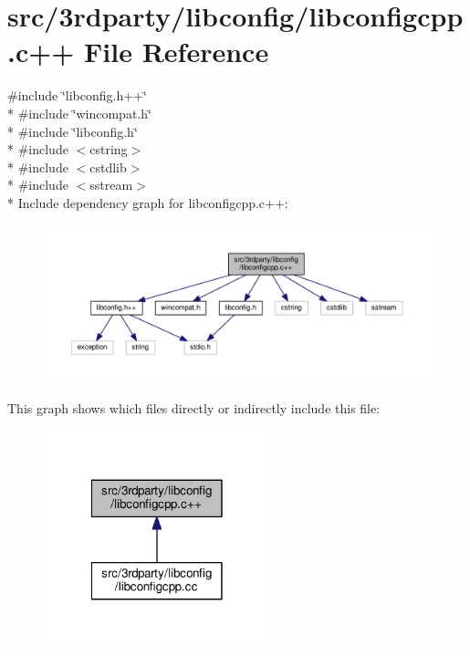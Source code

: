 \hypertarget{libconfigcpp_8c_09_09}{\section{src/3rdparty/libconfig/libconfigcpp.c++ File Reference}
\label{libconfigcpp_8c_09_09}
}
{\ttfamily \#include \char`\"{}libconfig.\-h++\char`\"{}}\\*
{\ttfamily \#include \char`\"{}wincompat.\-h\char`\"{}}\\*
{\ttfamily \#include \char`\"{}libconfig.\-h\char`\"{}}\\*
{\ttfamily \#include $<$cstring$>$}\\*
{\ttfamily \#include $<$cstdlib$>$}\\*
{\ttfamily \#include $<$sstream$>$}\\*
Include dependency graph for libconfigcpp.\-c++\-:\nopagebreak
\begin{figure}[H]
\begin{center}
\leavevmode
\includegraphics[width=350pt]{libconfigcpp_8c_09_09__incl}
\end{center}
\end{figure}
This graph shows which files directly or indirectly include this file\-:\nopagebreak
\begin{figure}[H]
\begin{center}
\leavevmode
\includegraphics[width=186pt]{libconfigcpp_8c_09_09__dep__incl}
\end{center}
\end{figure}
